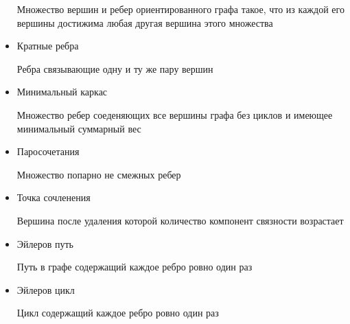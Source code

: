\begin{itemize}
    \begin{mydef}
        Множество вершин и ребер ориентированного графа такое, что из каждой его вершины достижима любая другая вершина этого множества
    \end{mydef}
\item     
    Кратные ребра
    \begin{mydef}
        Ребра связывающие одну и ту же пару вершин
    \end{mydef}
\item     
    Минимальный каркас
    \begin{mydef}
        Множество ребер соеденяющих все вершины графа без циклов и имеющее минимальный суммарный вес
    \end{mydef}
\item     
    Паросочетания
    \begin{mydef}
        Множество попарно не смежных ребер
    \end{mydef}
\item     
    Точка сочленения
    \begin{mydef}
        Вершина после удаления которой количество компонент связности возрастает
    \end{mydef}
\item     
    Эйлеров путь
    \begin{mydef}
        Путь в графе содержащий каждое ребро ровно один раз
    \end{mydef}
\item     
    Эйлеров цикл
    \begin{mydef}
        Цикл содержащий каждое ребро ровно один раз
    \end{mydef}
\end{itemize}
